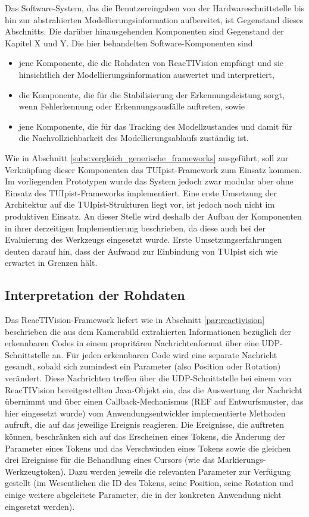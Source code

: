 Das Software-System, das die Benutzereingaben von der Hardwareschnittstelle bis hin zur abstrahierten Modellierungsinformation aufbereitet, ist Gegenstand dieses Abschnitts. Die darüber hinausgehenden Komponenten sind Gegenstand der Kapitel X und Y. Die hier behandelten Software-Komponenten sind
\begin{itemize}
	\item jene Komponente, die die Rohdaten von ReacTIVision empfängt und sie hinsichtlich der Modellierungsinformation auswertet und interpretiert,
	\item die Komponente, die für die Stabilisierung der Erkennungsleistung sorgt, wenn Fehlerkennung oder Erkennungsausfälle auftreten, sowie
	\item jene Komponente, die für das Tracking des Modellzustandes und damit für die Nachvollziehbarkeit des Modellierungsablaufs zuständig ist. 
\end{itemize}
Wie in Abschnitt \ref{subs:vergleich_generische_frameworks} ausgeführt, soll zur Verknüpfung dieser Komponenten das TUIpist-Framework zum Einsatz kommen. Im vorliegenden Prototypen wurde das System jedoch zwar modular aber ohne Einsatz des TUIpist-Frameworks implementiert. Eine erste Umsetzung der Architektur auf die TUIpist-Strukturen liegt vor, ist jedoch noch nicht im produktiven Einsatz. An dieser Stelle wird deshalb der Aufbau der Komponenten in ihrer derzeitigen Implementierung beschrieben, da diese auch bei der Evaluierung des Werkzeugs eingesetzt wurde. Erste Umsetzungserfahrungen deuten darauf hin, dass der Aufwand zur Einbindung von TUIpist sich wie erwartet in Grenzen hält.

\subsection{Interpretation der Rohdaten} %
\label{sub:interpretation_der_rohdaten}

Das ReacTIVision-Framework liefert wie in Abschnitt \ref{par:reactivision} beschrieben die aus dem Kamerabild extrahierten Informationen bezüglich der erkennbaren Codes in einem propritären Nachrichtenformat über eine UDP-Schnittstelle an. Für jeden erkennbaren Code wird eine separate Nachricht gesandt, sobald sich zumindest ein Parameter (also Position oder Rotation) verändert. Diese Nachrichten treffen über die UDP-Schnittstelle bei einem von ReacTIVision bereitgestellten Java-Objekt ein, das die Auswertung der Nachricht übernimmt und über einen Callback-Mechanismus (REF auf Entwurfsmuster, das hier eingesetzt wurde) vom Anwendungsentwickler implementierte Methoden aufruft, die auf das jeweilige Ereignis reagieren. Die Ereignisse, die auftreten können, beschränken sich auf das Erscheinen eines Tokens, die Änderung der Parameter eines Tokens und das Verschwinden eines Tokens sowie die gleichen drei Ereignisse für die Behandlung eines Cursors (wie das Markierungs-Werkzeugtoken). Dazu werden jeweils die relevanten Parameter zur Verfügung gestellt (im Wesentlichen die ID des Tokens, seine Position, seine Rotation und einige weitere abgeleitete Parameter, die in der konkreten Anwendung nicht eingesetzt werden).

